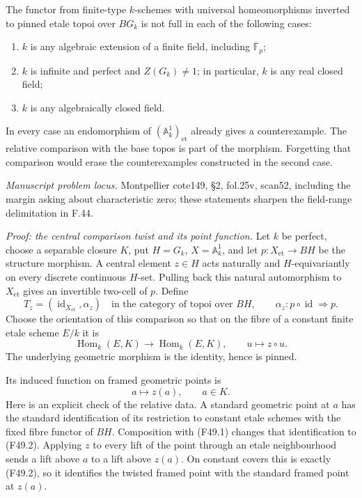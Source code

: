 The functor from finite-type $k$-schemes with universal homeomorphisms
inverted to pinned etale topoi over $B G_k$ is not full in each of
the following cases:
\begin{enumerate}
\item $k$ is any algebraic extension of a finite field, including
      $\overline{\mathbb F}_p$;
\item $k$ is infinite and perfect and $Z(G_k)\ne1$; in particular,
      $k$ is any real closed field;
\item $k$ is any algebraically closed field.
\end{enumerate}
In every case an endomorphism of $(\mathbb A^1_k)_{\mathrm{et}}$
already gives a counterexample. The relative comparison with the
base topos is part of the morphism. Forgetting that comparison would
erase the counterexamples constructed in the second case.

\emph{Manuscript problem locus.} Montpellier cote149, \S2,
fol.25v, scan52, including the margin asking about characteristic
zero; these statements sharpen the field-range delimitation in F.44.

\emph{Proof: the central comparison twist and its point function.}
Let $k$ be perfect, choose a separable closure $K$, put $H=G_k$,
$X=\mathbb A^1_k$, and let $p:X_{\mathrm{et}}\to BH$ be the
structure morphism. A central element $z\in H$ acts naturally and
$H$-equivariantly on every discrete continuous $H$-set. Pulling back
this natural automorphism to $X_{\mathrm{et}}$ gives an invertible
two-cell of $p$. Define
\[
 T_z=(\operatorname{id}_{X_{\mathrm{et}}},\alpha_z)
       \quad\text{in the category of topoi over }BH,
 \qquad \alpha_z:p\circ\operatorname{id}\Longrightarrow p.
                                                               \tag{F49.1}
\]
Choose the orientation of this comparison so that on the fibre of a
constant finite etale scheme $E/k$ it is
\[
 \operatorname{Hom}_k(E,K)\longrightarrow
 \operatorname{Hom}_k(E,K),\qquad u\longmapsto z\circ u.
                                                               \tag{F49.2}
\]
The underlying geometric morphism is the identity, hence is pinned.

Its induced function on framed geometric points is
\[
                         a\longmapsto z(a),\qquad a\in K.
                                                               \tag{F49.3}
\]
Here is an explicit check of the relative data. A standard geometric
point at $a$ has the standard identification of its restriction to
constant etale schemes with the fixed fibre functor of $BH$.
Composition with (F49.1) changes that identification to (F49.2).
Applying $z$ to every lift of the point through an etale neighbourhood
sends a lift above $a$ to a lift above $z(a)$. On constant covers
this is exactly (F49.2), so it identifies the twisted framed point
with the standard framed point at $z(a)$.

